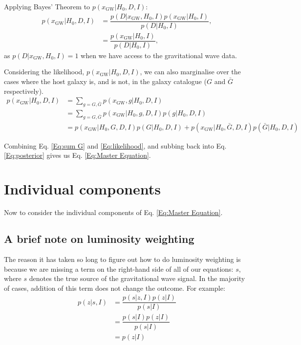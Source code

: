 \documentclass[a4paper,10pt]{article}
\begin{document}
{Applying Bayes' Theorem to $p(x_{\text{GW}}|H_0,D,I)$:
\begin{equation} \label{Eq:likelihood}
\begin{aligned}
p(x_{\text{GW}}|H_0,D,I) &= \dfrac{p(D|x_{\text{GW}},H_0,I)p(x_{\text{GW}}|H_0,I)}{p(D|H_0,I)},
\\ &= \dfrac{p(x_{\text{GW}}|H_0,I)}{p(D|H_0,I)},
\end{aligned} 
\end{equation}
as $p(D|x_{\text{GW}},H_0,I)=1$ when we have access to the gravitational wave data.

Considering the likelihood, $p(x_{\text{GW}}|H_0,D,I)$, we can also marginalise over the cases where the host galaxy is, and is not, in the galaxy catalogue ($G$ and $\bar{G}$ respectively).
\begin{equation} \label{Eq:sum G}
\begin{aligned}
p(x_{\text{GW}}|H_0,D,I) &= \sum_{g=G,\bar{G}} p(x_{\text{GW}},g|H_0,D,I)
\\ &= \sum_{g=G,\bar{G}} p(x_{\text{GW}}|H_0,g,D,I) p(g|H_0,D,I)
\\ &= p(x_{\text{GW}}|H_0,G,D,I) p(G|H_0,D,I) + p(x_{\text{GW}}|H_0,\bar{G},D,I) p(\bar{G}|H_0,D,I)
\end{aligned} 
\end{equation}

Combining Eq. \ref{Eq:sum G} and \ref{Eq:likelihood}, and subbing back into Eq. \ref{Eq:posterior} gives us Eq. \ref{Eq:Master Equation}.


\section{Individual components}
Now to consider the individual components of Eq. \ref{Eq:Master Equation}.


\subsection{A brief note on luminosity weighting}
The reason it has taken so long to figure out how to do luminosity weighting is because we are missing a term on the right-hand side of all of our equations: $s$, where $s$ denotes the true source of the gravitational wave signal.  In the majority of cases, addition of this term does not change the outcome.  For example:
\begin{equation}
\begin{aligned}
p(z|s,I) &= \dfrac{p(s|z,I) p(z|I)}{p(s|I)} 
\\ &= \dfrac{p(s|I) p(z|I)}{p(s|I)} 
\\ &= p(z|I)
\end{aligned}
\end{equation}

}
\end{document}

